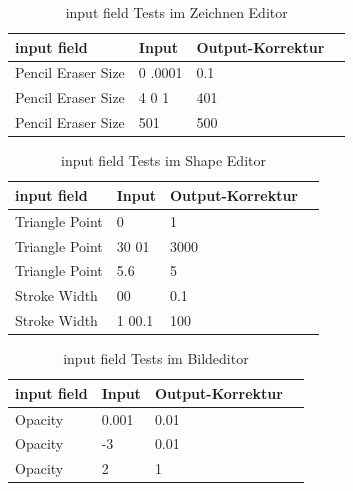 \begin{table}[!htbp]
	\centering
	\begin{tabular}{|p{4cm}|p{3cm}|p{3cm}|p{3cm}|}
		\hline
		\textbf{input field}			& \textbf{Input} 			& \textbf{Output-Korrektur}		\\ 
		\hline
		Pencil Eraser Size 					& 0 .0001					& 0.1  						\\
		Pencil Eraser Size					& 4 0 1 					& 401						\\ 
		Pencil Eraser Size					& 501 						& 500						\\ 
		\hline
	\end{tabular}
	\caption{input field Tests im Zeichnen Editor}
	\label{table:draw-input}
\end{table}

\begin{table}[!htbp]
	\centering
	\begin{tabular}{|p{4cm}|p{3cm}|p{3cm}|p{3cm}|}
		\hline
		\textbf{input field}			& \textbf{Input} 			& \textbf{Output-Korrektur}	\\ 
		\hline
		Triangle Point 					& 0							& 1  						\\
		Triangle Point					& 30 01 					& 3000						\\ 
		Triangle Point					& 5.6 						& 5							\\ 
		Stroke Width 					& 00						& 0.1  						\\
		Stroke Width					& 1 00.1 					& 100						\\ 
		\hline
	\end{tabular}
	\caption{input field Tests im Shape Editor}
	\label{table:shape-input}
\end{table}

\begin{table}[!htbp]
	\centering
	\begin{tabular}{|p{4cm}|p{3cm}|p{3cm}|p{3cm}|}
		\hline
		\textbf{input field}		& \textbf{Input} 			& \textbf{Output-Korrektur}	\\ 
		\hline
		Opacity 					& 0.001						& 0.01  					\\
		Opacity						& -3 						& 0.01						\\ 
		Opacity						& 2 						& 1							\\ 
		\hline
	\end{tabular}
	\caption{input field Tests im Bildeditor}
	\label{table:img-input}
\end{table}

